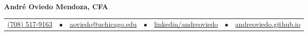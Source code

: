 \documentclass{article}
\begin{document}
    \fontsize{9}{15}
    \selectfont
    \begin{center}
        \begin{center}
            \huge\bfseries André Oviedo Mendoza, CFA
        \end{center}
            \begin{tabular}{c c c c c c c}
                \href{tel:(708)517-9163}{(708) 517-9163}  & $\bullet$ &
                \href{mailto:aoviedo@uchicago.edu}{aoviedo@uchicago.edu}  & $\bullet$ & 
                \href{https://www.linkedin.com/in/andreoviedo/}{linkedin/andreoviedo} &$\bullet$ &
                \href{https://andreoviedo.github.io/}{andreoviedo.github.io}\\
        \end{tabular}
    \end{center}    
    \vspace{-0.75em}
    
    
        
    
  
\end{document}
